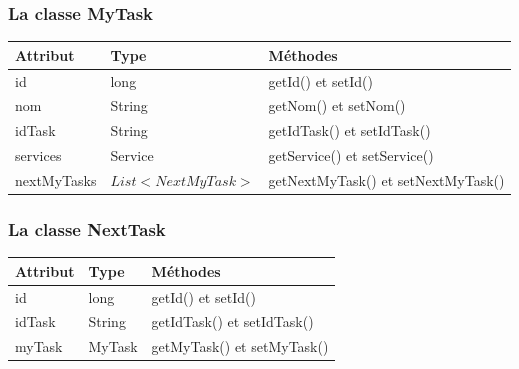 \subsubsection*{La classe MyTask}
\begin{table}[H]
	\centering
	\begin{tabular}{|l|l|l|}
		\hline
		\textbf{Attribut}  & \textbf{Type} & \multicolumn{1}{l|}{\textbf{Méthodes}} \\ \hline
		
		id & long & getId() et setId()\\ \cline{1-2}
		nom & String  & getNom() et setNom() \\ \cline{1-2}
		idTask & String & getIdTask() et setIdTask()\\ \cline{1-2}
		services & Service  & getService() et setService() \\ \cline{1-2}
		nextMyTasks	& $ List<NextMyTask> $ & getNextMyTask() et setNextMyTask()   \\ \hline
	\end{tabular}
\end{table}

\subsubsection*{La classe NextTask}
\begin{table}[H]
  \centering\setlength\tabcolsep{1cm}

	\begin{tabular}{|l|l|l|}
		\hline
		\textbf{Attribut}  & \textbf{Type} & \multicolumn{1}{l|}{\textbf{Méthodes}} \\ \hline
		
		id & long & getId() et setId()\\ \cline{1-2}
		idTask & String & getIdTask() et setIdTask()\\ \cline{1-2}
		myTask & MyTask  & getMyTask() et setMyTask()   \\ \hline
	\end{tabular}
\end{table}

